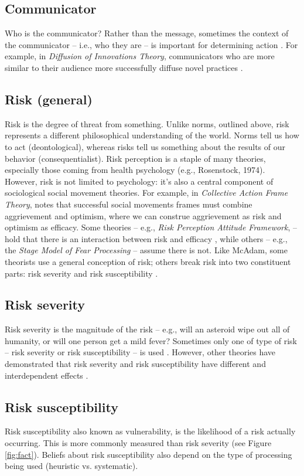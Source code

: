 \documentclass[12 pt]{article}
\begin{document}
		\subsection{Communicator}
		Who is the communicator? Rather than the message, sometimes the context of the communicator -- i.e., who they are -- is important for determining action \parencite{Chaiken1980}. For example, in \textit{Diffusion of Innovations Theory}, communicators who are more similar to their audience more successfully diffuse novel practices \parencite{Rogers2010}. 
		\subsection{Risk (general)}
		Risk is the degree of threat from something. Unlike norms, outlined above, risk represents a different philosophical understanding of the world. Norms tell us how to act (deontological), whereas risks tell us something about the results of our behavior (consequentialist). Risk perception is a staple of many theories, especially those coming from health psychology (e.g., Rosenstock, 1974). However, risk is not limited to psychology: it's also a central component of sociological social movement theories. For example, in \textit{Collective Action Frame Theory},  \textcite{McAdam1996} notes that successful social movements frames must combine aggrievement and optimism, where we can construe aggrievement as risk and optimism as efficacy. Some theories -- e.g., \textit{Risk Perception Attitude Framework}, -- hold that there is an interaction between risk and efficacy \parencite{Rimal2001}, while others -- e.g., the \textit{Stage Model of Fear Processing} \parencite{DeHoog2007} -- assume there is not. Like McAdam, some theorists use a general conception of risk; others break risk into two constituent parts: risk severity and risk susceptibility \parencite{Maloney2011}. 
		\subsection{Risk severity}
		Risk severity is the magnitude of the risk -- e.g., will an asteroid wipe out all of humanity, or will one person get a mild fever? Sometimes only one of type of risk -- risk severity or risk susceptibility -- is used \parencite[e.g.,][]{Rimal2001}. However, other theories have demonstrated that risk severity and risk susceptibility have different and interdependent effects \parencite{DeHoog2007}.
		\subsection{Risk susceptibility}
		Risk susceptibility also known as vulnerability, is the likelihood of a risk actually occurring. This is more commonly measured than risk severity (see Figure \ref{fig:fact}). Beliefs about risk susceptibility also depend on the type of processing being used (heuristic vs. systematic). 
\end{document}
